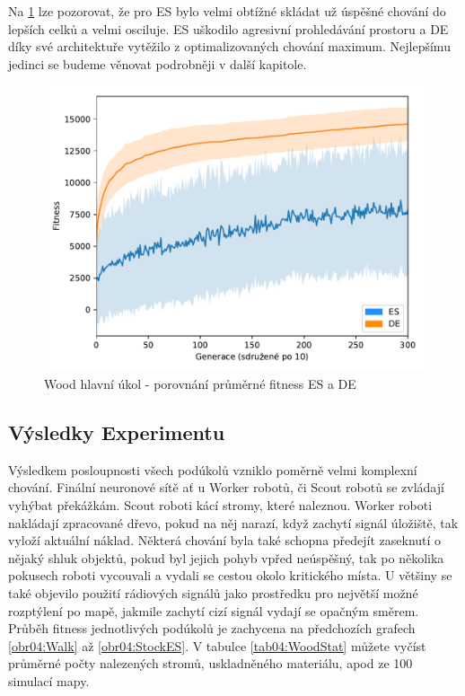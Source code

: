 	Na \ref{obr04:CoopESvsDE} lze pozorovat, že pro ES bylo velmi obtížné skládat už úspěšné chování do lepších celků a velmi osciluje. ES uškodilo agresivní prohledávání prostoru a DE díky své architektuře vytěžilo z optimalizovaných chování maximum. Nejlepšímu jedinci se budeme věnovat podrobněji v další kapitole. 
		\clearpage
		\begin{figure}[t]\centering
		\includegraphics[width=\columnwidth]{../img/WoodMap/DEvsES/WoodCoopMem}
		\caption{Wood hlavní úkol  - porovnání průměrné fitness ES a DE}
		\label{obr04:CoopESvsDE}
	\end{figure}
	\clearpage
	
	\subsection*{Výsledky Experimentu}
	Výsledkem posloupnosti všech podúkolů vzniklo poměrně velmi komplexní chování. Finální neuronové sítě ať u Worker robotů, či Scout robotů se zvládají vyhýbat překážkám. Scout roboti kácí stromy, které naleznou. Worker roboti nakládají zpracované dřevo, pokud na něj narazí, když zachytí signál úložiště, tak vyloží aktuální náklad. Některá chování byla také schopna předejít zaseknutí o nějaký shluk objektů, pokud byl  jejich pohyb vpřed neúspěšný, tak po několika pokusech roboti vycouvali a vydali se cestou okolo kritického místa. U většiny se také objevilo použití rádiových signálů jako prostředku pro největší možné rozptýlení po mapě, jakmile zachytí cizí signál vydají se opačným směrem. Průběh fitness jednotlivých podúkolů je zachycena na předchozích grafech \ref{obr04:Walk} až \ref{obr04:StockES}. V tabulce \ref{tab04:WoodStat} můžete vyčíst průměrné počty nalezených stromů, uskladněného materiálu, apod ze 100 simulací mapy. 
	
